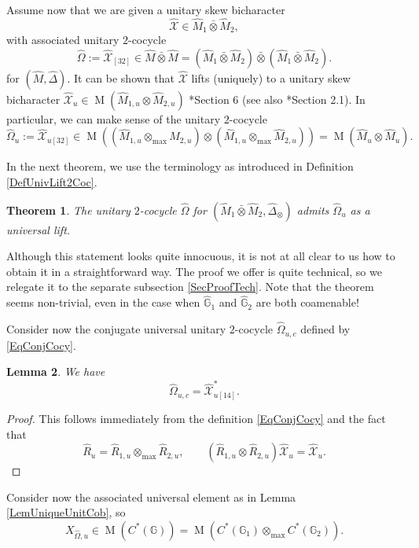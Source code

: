 \documentclass[reqno]{amsart}
\numberwithin{equation}{section}
\newtheorem{Theorem}{Theorem}[section]
\newtheorem{Lem}[Theorem]{Lemma}
\newcommand{\G}{\mathbb{G}}
\newcommand{\mcX}{\mathcal{X}}
\newcommand{\wh}{\widehat}
\newcommand{\Mult}{\operatorname{M}}
\begin{document}
Assume now that we are given a unitary skew bicharacter
\[
\wh{\mcX}\in \hat{M}_1\bar{\otimes}\hat{M}_2,
\] 
with associated unitary $2$-cocycle 
\begin{equation}\label{EqCocycBiChar}
\hat{\Omega} := \wh{\mcX}_{[32]} \in \hat{M}\bar{\otimes}\hat{M} = (\hat{M}_1\bar{\otimes}\hat{M}_2)\bar{\otimes}(\hat{M}_1\bar{\otimes}\hat{M}_2). 
\end{equation}
for $(\hat{M},\hat{\Delta})$. It can be shown that $\wh{\mcX}$ lifts (uniquely) to a unitary skew bicharacter $\wh{\mcX}_u \in \Mult(\hat{M}_{1,u}\otimes \hat{M}_{2,u})$ \cite{Kus01}*{Section 6} (see also \cite{Daw16}*{Section 2.1}). In particular, we can make sense of the unitary $2$-cocycle
\[
\hat{\Omega}_u :=  \wh{\mcX}_{u [32]} \in \Mult((\hat{M}_{1,u}\otimes_{\max}\hat{M}_{2,u})\otimes (\hat{M}_{1,u}\otimes_{\max}\hat{M}_{2,u})) = \Mult(\hat{M}_u \otimes \hat{M}_u).
\]

In the next theorem, we use the terminology as introduced in Definition \ref{DefUnivLift2Coc}.
\begin{Theorem}\label{TheoUnivLift}
The unitary $2$-cocycle $\hat{\Omega}$ for $(\hat{M}_1\bar{\otimes}\hat{M}_2,\hat{\Delta}_{\otimes})$ admits $\hat{\Omega}_u$ as a universal lift.
\end{Theorem} 
Although this statement looks quite innocuous, it is not at all clear to us how to obtain it in a straightforward way. The proof we offer is quite technical, so we relegate it to the separate subsection \ref{SecProofTech}. Note that the theorem seems non-trivial, even in the case when $\hat{\G}_1$ and $\hat{\G}_2$ are both coamenable!

Consider now the conjugate universal unitary $2$-cocycle $\hat{\Omega}_{u,c}$ defined by \eqref{EqConjCocy}. 

\begin{Lem}\label{LemConjCocy}
We have 
\[
\hat{\Omega}_{u,c} = \wh{\mcX}_{u [14]}^*.
\]
\end{Lem}
\begin{proof}
This follows immediately from the definition \eqref{EqConjCocy} and the fact that 
\[
\hat{R}_u = \hat{R}_{1,u}\otimes_{\max}\hat{R}_{2,u},\qquad 
(\hat{R}_{1,u} \otimes \hat{R}_{2,u})\wh{\mcX}_u = \wh{\mcX}_u.
\]
\end{proof}


Consider now the associated universal element as in Lemma \ref{LemUniqueUnitCob}, so 
\[
X_{\hat{\Omega},u} \in \Mult(C^*(\G)) = \Mult(C^*(\G_1)\otimes_{\max}C^*(\G_2)).
\]
\end{document}
